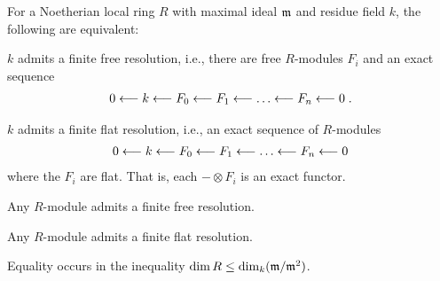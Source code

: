\documentclass[a4paper,parskip=half,numbers=enddot, DIV=12]{scrreprt}
\begin{document}
\begin{thm}[Serre] 
    For a Noetherian local ring $R$ with maximal ideal $\mathfrak{m}$ and residue field $k$, the following are equivalent:
    \begin{alphanumerate}
    \item 
        $k$ admits a finite free resolution, i.e., there are free $R$-modules $F_i$ and an exact sequence
            \begin{align*}
                0 \lmorphism k \lmorphism F_0 \lmorphism F_1 \lmorphism \ldots \lmorphism F_n \lmorphism 0\;.
            \end{align*}
    \item 
        $k$ admits a finite flat resolution, i.e., an exact sequence of $R$-modules
            \begin{align*}
                0 \lmorphism k \lmorphism F_0 \lmorphism F_1 \lmorphism \ldots \lmorphism F_n \lmorphism 0
            \end{align*}
        where the $F_i$ are flat. That is, each $-\otimes F_i$ is an exact functor.
    \item 
        Any $R$-module admits a finite free resolution.
    \item 
        Any $R$-module admits a finite flat resolution.
    \item 
        Equality occurs in the inequality $\dim R \leq \dim_k (\mathfrak{m}/\mathfrak{m}^2)$.
    \end{alphanumerate}
\end{thm}
\end{document}
